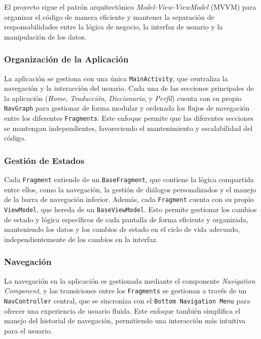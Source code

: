 El proyecto sigue el patrón arquitectónico \textit{Model-View-ViewModel} (MVVM) para organizar el código de manera eficiente y mantener la separación de responsabilidades entre la lógica de negocio, la interfaz de usuario y la manipulación de los datos.

\subsubsection{Organización de la Aplicación}

La aplicación se gestiona con una única \texttt{MainActivity}, que centraliza la navegación y la interacción del usuario. Cada una de las secciones principales de la aplicación (\textit{Home}, \textit{Traducción}, \textit{Diccionario}, y \textit{Perfil}) cuenta con su propio \texttt{NavGraph} para gestionar de forma modular y ordenada los flujos de navegación entre los diferentes \texttt{Fragments}. Este enfoque permite que las diferentes secciones se mantengan independientes, favoreciendo el mantenimiento y escalabilidad del código.

\subsubsection{Gestión de Estados}

Cada \texttt{Fragment} extiende de un \texttt{BaseFragment}, que contiene la lógica compartida entre ellos, como la navegación, la gestión de diálogos personalizados y el manejo de la barra de navegación inferior. Además, cada \texttt{Fragment} cuenta con su propio \texttt{ViewModel}, que hereda de un \texttt{BaseViewModel}. Esto permite gestionar los cambios de estado y lógica específicos de cada pantalla de forma eficiente y organizada, manteniendo los datos y los cambios de estado en el ciclo de vida adecuado, independientemente de los cambios en la interfaz.

\subsubsection{Navegación}

La navegación en la aplicación es gestionada mediante el componente \textit{Navigation Component}, y las transiciones entre los \texttt{Fragments} se gestionan a través de un \texttt{NavController} central, que se sincroniza con el \texttt{Bottom Navigation Menu} para ofrecer una experiencia de usuario fluida. Este enfoque también simplifica el manejo del historial de navegación, permitiendo una interacción más intuitiva para el usuario.

